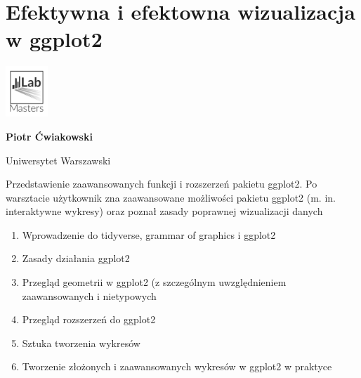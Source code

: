 \documentclass[\main/boa.tex]{subfiles}
\begin{document}
\section{Efektywna i efektowna wizualizacja w ggplot2}
\begin{minipage}[t]{0.915\textwidth}
	\center     
    \includegraphics[width=60px]{img/workshops/czarno_biale/lab.png} 
\end{minipage}

\begin{minipage}{0.915\textwidth}
\centering
{\bf {} Piotr Ćwiakowski}
\end{minipage}

\vskip 0.3cm

\begin{affiliations}
\begin{minipage}{0.915\textwidth}
\centering
\large Uniwersytet Warszawski  \\[2pt]
\end{minipage}
\end{affiliations}

\vskip 0.8cm

\opiswarsztatu Przedstawienie zaawansowanych funkcji i rozszerzeń pakietu ggplot2. Po warsztacie użytkownik zna zaawansowane możliwości pakietu ggplot2 (m. in. interaktywne wykresy) oraz poznał zasady poprawnej wizualizacji danych

\planwarsztatu
\begin{enumerate}
\item Wprowadzenie do tidyverse, grammar of graphics i ggplot2
\item Zasady działania ggplot2
\item Przegląd geometrii w ggplot2 (z szczególnym uwzględnieniem zaawansowanych i nietypowych
\item Przegląd rozszerzeń do ggplot2
\item Sztuka tworzenia wykresów
\item Tworzenie złożonych i zaawansowanych wykresów w ggplot2 w praktyce
\end{enumerate}	 
\end{document}
